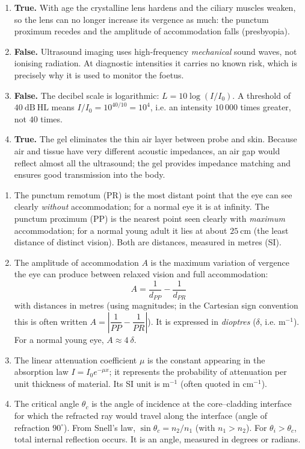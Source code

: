 \documentclass[11pt]{article}
\providecommand{\degree}{^{\circ}}
\newcommand{\cle}[1]{{\popxbold\color{popdark}#1}}
\begin{document}
\begin{corrige}
\begin{enumerate}
\item \textbf{True.} With age the crystalline lens hardens and the ciliary muscles weaken, so the lens can no longer increase its vergence as much: the punctum proximum recedes and the amplitude of accommodation falls (presbyopia).
\item \textbf{False.} Ultrasound imaging uses high-frequency \emph{mechanical} sound waves, not ionising radiation. At diagnostic intensities it carries no known risk, which is precisely why it is used to monitor the foetus.
\item \textbf{False.} The decibel scale is logarithmic: $L = 10\log(I/I_0)$. A threshold of $40\ \mathrm{dB\ HL}$ means $I/I_0 = 10^{40/10} = 10^4$, i.e. an intensity $10\,000$ times greater, not $40$ times.
\item \textbf{True.} The gel eliminates the thin air layer between probe and skin. Because air and tissue have very different acoustic impedances, an air gap would reflect almost all the ultrasound; the gel provides impedance matching and ensures good transmission into the body.
\end{enumerate}
\end{corrige}

\begin{corrige}
\begin{enumerate}
\item The \cle{punctum remotum} (PR) is the most distant point that the eye can see clearly \emph{without} accommodation; for a normal eye it is at infinity. The \cle{punctum proximum} (PP) is the nearest point seen clearly with \emph{maximum} accommodation; for a normal young adult it lies at about $25\ \mathrm{cm}$ (the least distance of distinct vision). Both are distances, measured in metres (SI).
\item The \cle{amplitude of accommodation} $A$ is the maximum variation of vergence the eye can produce between relaxed vision and full accommodation:
\[ A = \frac{1}{d_{PP}} - \frac{1}{d_{PR}} \]
with distances in metres (using magnitudes; in the Cartesian sign convention this is often written $A = \left|\dfrac{1}{PP} - \dfrac{1}{PR}\right|$). It is expressed in \emph{dioptres} ($\delta$, i.e. $\mathrm{m^{-1}}$). For a normal young eye, $A \approx 4\ \delta$.
\item The \cle{linear attenuation coefficient} $\mu$ is the constant appearing in the absorption law $I = I_0 e^{-\mu x}$; it represents the probability of attenuation per unit thickness of material. Its SI unit is $\mathrm{m^{-1}}$ (often quoted in $\mathrm{cm^{-1}}$).
\item The \cle{critical angle} $\theta_c$ is the angle of incidence at the core--cladding interface for which the refracted ray would travel along the interface (angle of refraction $90\degree$). From Snell's law, $\sin\theta_c = n_2/n_1$ (with $n_1 > n_2$). For $\theta_i > \theta_c$, total internal reflection occurs. It is an angle, measured in degrees or radians.
\end{enumerate}
\end{corrige}
\end{document}
